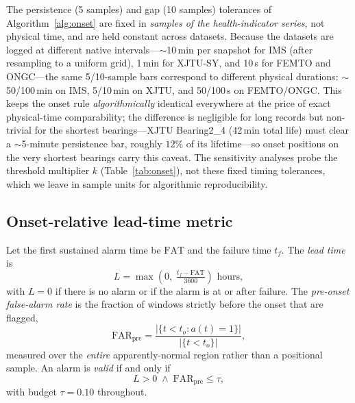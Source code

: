 \documentclass[journal]{IEEEtran}
\begin{document}
The persistence (5 samples) and gap (10 samples) tolerances of
Algorithm~\ref{alg:onset} are fixed in \emph{samples of the health-indicator
series}, not physical time, and are held constant across datasets. Because the
datasets are logged at different native intervals---$\sim$10\,min per snapshot
for IMS (after resampling to a uniform grid), 1\,min for XJTU-SY, and 10\,s for
FEMTO and ONGC---the same 5/10-sample bars correspond to different physical
durations: $\sim$50/100\,min on IMS, 5/10\,min on XJTU, and 50/100\,s on
FEMTO/ONGC. This keeps the onset rule \emph{algorithmically} identical everywhere
at the price of exact physical-time comparability; the difference is negligible
for long records but non-trivial for the shortest bearings---XJTU Bearing2\_4
(42\,min total life) must clear a $\sim$5-minute persistence bar, roughly $12\%$
of its lifetime---so onset positions on the very shortest bearings carry this
caveat. The sensitivity analyses probe the threshold multiplier $k$
(Table~\ref{tab:onset}), not these fixed timing tolerances, which we leave in
sample units for algorithmic reproducibility.

\subsection{Onset-relative lead-time metric}
Let the first sustained alarm time be $\mathrm{FAT}$ and the failure time
$t_f$. The \emph{lead time} is
\begin{equation}
L = \max\!\left(0,\; \tfrac{t_f - \mathrm{FAT}}{3600}\right) \text{ hours},
\end{equation}
with $L{=}0$ if there is no alarm or if the alarm is at or after failure. The
\emph{pre-onset false-alarm rate} is the fraction of windows strictly before
the onset that are flagged,
\begin{equation}
\mathrm{FAR}_{\mathrm{pre}} =
\frac{|\{t < t_o : a(t){=}1\}|}{|\{t < t_o\}|},
\end{equation}
measured over the \emph{entire} apparently-normal region rather than a
positional sample. An alarm is \emph{valid} if and only if
\begin{equation}
L > 0 \;\wedge\; \mathrm{FAR}_{\mathrm{pre}} \le \tau,
\label{eq:valid}
\end{equation}
with budget $\tau{=}0.10$ throughout.
\end{document}
